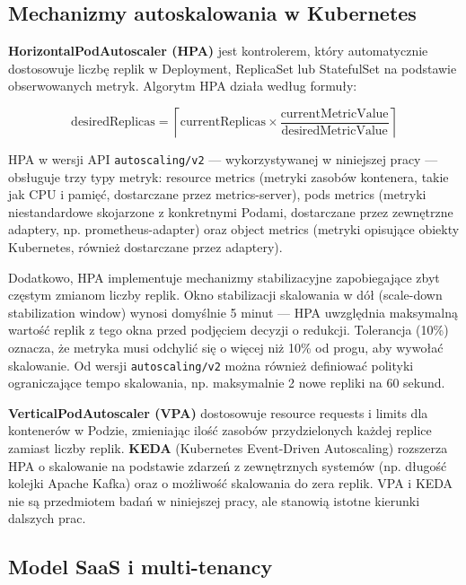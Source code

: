 \subsection{Mechanizmy autoskalowania w Kubernetes}

\textbf{HorizontalPodAutoscaler (HPA)} jest kontrolerem, który automatycznie dostosowuje liczbę replik w Deployment, ReplicaSet lub StatefulSet na podstawie obserwowanych metryk. Algorytm HPA działa według formuły:

\begin{equation}
  \text{desiredReplicas} = \left\lceil \text{currentReplicas} \times \frac{\text{currentMetricValue}}{\text{desiredMetricValue}} \right\rceil
\end{equation}

HPA w wersji API \texttt{autoscaling/v2} --- wykorzystywanej w niniejszej pracy --- obsługuje trzy typy metryk: resource metrics (metryki zasobów kontenera, takie jak CPU i pamięć, dostarczane przez metrics-server), pods metrics (metryki niestandardowe skojarzone z konkretnymi Podami, dostarczane przez zewnętrzne adaptery, np. prometheus-adapter) oraz object metrics (metryki opisujące obiekty Kubernetes, również dostarczane przez adaptery).

Dodatkowo, HPA implementuje mechanizmy stabilizacyjne zapobiegające zbyt częstym zmianom liczby replik. Okno stabilizacji skalowania w dół (scale-down stabilization window) wynosi domyślnie 5 minut --- HPA uwzględnia maksymalną wartość replik z tego okna przed podjęciem decyzji o redukcji. Tolerancja (10\%) oznacza, że metryka musi odchylić się o więcej niż 10\% od progu, aby wywołać skalowanie. Od wersji \texttt{autoscaling/v2} można również definiować polityki ograniczające tempo skalowania, np. maksymalnie 2 nowe repliki na 60 sekund.

\textbf{VerticalPodAutoscaler (VPA)} dostosowuje resource requests i limits dla kontenerów w Podzie, zmieniając ilość zasobów przydzielonych każdej replice zamiast liczby replik. \textbf{KEDA} (Kubernetes Event-Driven Autoscaling) rozszerza HPA o skalowanie na podstawie zdarzeń z zewnętrznych systemów (np. długość kolejki Apache Kafka) oraz o możliwość skalowania do zera replik. VPA i KEDA nie są przedmiotem badań w niniejszej pracy, ale stanowią istotne kierunki dalszych prac.

\subsection{Model SaaS i multi-tenancy}

